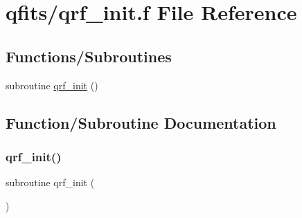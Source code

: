 \hypertarget{qrf__init_8f}{}\section{qfits/qrf\+\_\+init.f File Reference}
\label{qrf__init_8f}
\subsection*{Functions/\+Subroutines}
\begin{DoxyCompactItemize}
\item 
subroutine \hyperlink{qrf__init_8f_a5f73d1e79f4a045545c485a9c9611c6e}{qrf\+\_\+init} ()
\end{DoxyCompactItemize}


\subsection{Function/\+Subroutine Documentation}
\mbox{\label{qrf__init_8f_a5f73d1e79f4a045545c485a9c9611c6e}} 
\subsubsection{\texorpdfstring{qrf\+\_\+init()}{qrf\_init()}}
{\footnotesize\ttfamily subroutine qrf\+\_\+init (\begin{DoxyParamCaption}{ }\end{DoxyParamCaption})}

